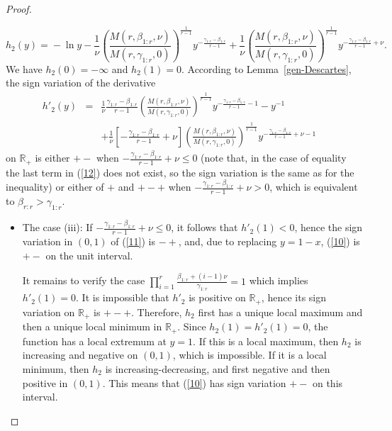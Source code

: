 \documentclass [11pt]{article}
\begin{document}
\begin{proof}
\begin{enumerate}
\begin{equation}
\label{11}
h_2(y) \!=\!  -\ln y- \frac{1}{\nu} 
    \left(\frac{M(r,\beta_{1:r},\nu)}{M(r,\gamma_{1:r},0)}\right)^{\frac1{r-1}}
    y^{-\frac{\gamma_{1:r}-\beta_{1:r}}{r-1}}
     + \frac{1}{\nu} 
    \left(\frac{M(r,\beta_{1:r},\nu)}{M(r,\gamma_{1:r},0)}\right)^{\frac1{r-1}}
    y^{-\frac{\gamma_{1:r}-\beta_{1:r}}{r-1}+\nu}.
\end{equation}
%
We have $h_2(0)=-\infty$ and $h_2(1)=0$. According to Lemma~\ref{gen-Descartes}, the sign variation of the derivative
    \begin{eqnarray}
    h'_2(y) & = &  \frac{1}{\nu} \frac{\gamma_{1:r}-\beta_{1:r}}{r-1}
    \left(\frac{M(r,\beta_{1:r},\nu)}{M(r,\gamma_{1:r},0)}\right)^{\frac1{r-1}}
    y^{-\frac{\gamma_{1:r}-\beta_{1:r}}{r-1}-1} -y^{-1} \nonumber \\
    & & + \frac{1}{\nu} \left[- \frac{\gamma_{1:r}-\beta_{1:r}}{r-1}+\nu \right]
    \left(\frac{M(r,\beta_{1:r},\nu)}{M(r,\gamma_{1:r},0)}\right)^{\frac1{r-1}}
    y^{-\frac{\gamma_{1:r}-\beta_{1:r}}{r-1}+\nu-1}\quad
    \label{12}
    \end{eqnarray}
    on $\mathbb{R}_+$ is either $+-$ when $-\frac{\gamma_{1:r}-\beta_{1:r}}{r-1}+\nu\leq0$ (note that, in the case of equality the last term in (\ref{12}) does not exist, so the sign variation is the same as for the inequality) or either of $+$ and $+-+$ when
    $-\frac{\gamma_{1:r}-\beta_{1:r}}{r-1}+\nu>0$, which is equivalent to $\beta_{r:r}>\gamma_{1:r}$.
       \begin{itemize}
        \item
        The case (iii): %
        If $-\frac{\gamma_{1:r}-\beta_{1:r}}{r-1}+\nu\leq0$, it follows that $h'_2(1)<0$, hence the sign variation in $(0,1)$ of (\ref{11}) is $-+$, and, due to replacing $y=1-x$, (\ref{10}) is $+-$ on the unit interval. 
        
        It remains to verify the case $\prod_{i=1}^r \frac{\beta_{1:r}+(i-1)\nu}{\gamma_{1:r}} =1$ which implies $h'_2(1)=0$.
        It is impossible that $h'_2$ is positive on $\mathbb{R}_+$, hence its sign variation on $\mathbb{R}_+$ is $+-+$. Therefore, $h_2$ first has a unique local maximum and then a unique local minimum in $\mathbb{R}_+$. Since $h_2(1)= h'_2(1)=0$, the function has a local extremum at $y=1$. If this is a local maximum, then $h_2$ is increasing and negative on $(0,1)$, which is impossible. If it is a local minimum, then $h_2$ is increasing-decreasing, and first negative and then positive in $(0,1)$. This means that (\ref{10}) has sign variation $+-$ on this interval.
        


\end{itemize}
\end{enumerate}
\end{proof}
\end{document}
